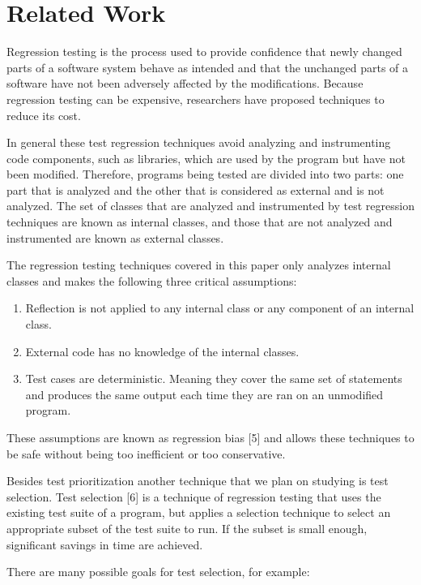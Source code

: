 \section{Related Work}

Regression testing is the process used to provide confidence that newly changed parts of a software system behave as intended and that the unchanged parts of a software have not been adversely affected by the modifications. Because regression testing can be expensive, researchers have proposed techniques to reduce its cost.  

In general these test regression techniques avoid analyzing and instrumenting code components, such as libraries, which are used by the program but have not been modified. Therefore, programs being tested are divided into two parts: one part that is analyzed and the other that is considered as external and is not analyzed. The set of classes that are analyzed and instrumented by test regression techniques are known as internal classes, and those that are not analyzed and instrumented are known as external classes.

The regression testing techniques covered in this paper only analyzes internal classes and makes the following three critical assumptions:

\begin{enumerate}
\item Reflection is not applied to any internal class or any component of an internal class. 
\item External code has no knowledge of the internal classes. 
\item Test cases are deterministic. Meaning they cover the same set of statements and produces the same output each time they are ran on an unmodified program. 
\end{enumerate}

These assumptions are known as regression bias [5] and allows these techniques to be safe without being too inefficient or too conservative. 

Besides test prioritization another technique that we plan on studying is test selection. Test selection [6] is a technique of regression testing that uses the existing test suite of a program, but applies a selection technique to select an appropriate subset of the test suite to run. If the subset is small enough, significant savings in time are achieved.

There are many possible goals for test selection, for example:

